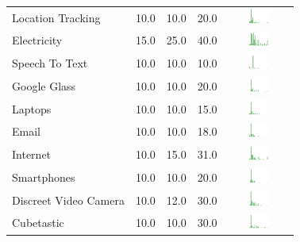 \begin{table}[t]
\begin{center}
\begin{tabular}{| p{2cm} | p{1cm} | p{1cm} | p{1cm} | c |}
Location Tracking  & 10.0 & 10.0 & 20.0 & \includegraphics[width = 2cm, height = 0.5cm]{tables/locationtrackingrisk} \\ 
Electricity & 15.0 & 25.0 & 40.0 & \includegraphics[width = 2cm, height = 0.5cm]{tables/ElectricityRisk} \\ 
Speech To Text  & 10.0 & 10.0 & 10.0 & \includegraphics[width = 2cm, height = 0.5cm]{tables/speechtotextrisk} \\ 
Google Glass  & 10.0 & 10.0 & 20.0 & \includegraphics[width = 2cm, height = 0.5cm]{tables/googleglassrisk} \\ 
Laptops  & 10.0 & 10.0 & 15.0 & \includegraphics[width = 2cm, height = 0.5cm]{tables/laptopsrisk} \\ 
Email  & 10.0 & 10.0 & 18.0 & \includegraphics[width = 2cm, height = 0.5cm]{tables/emailrisk} \\ 
Internet  & 10.0 & 15.0 & 31.0 & \includegraphics[width = 2cm, height = 0.5cm]{tables/internetrisk} \\ 
Smartphones  & 10.0 & 10.0 & 20.0 & \includegraphics[width = 2cm, height = 0.5cm]{tables/smartphonesrisk} \\ 
Discreet Video Camera  & 10.0 & 12.0 & 30.0 & \includegraphics[width = 2cm, height = 0.5cm]{tables/discreetvideocamerarisk} \\ 
Cubetastic  & 10.0 & 10.0 & 30.0 & \includegraphics[width = 2cm, height = 0.5cm]{tables/cubetasticrisk} \\ 

\end{tabular}
\end{center}
\end{table}
